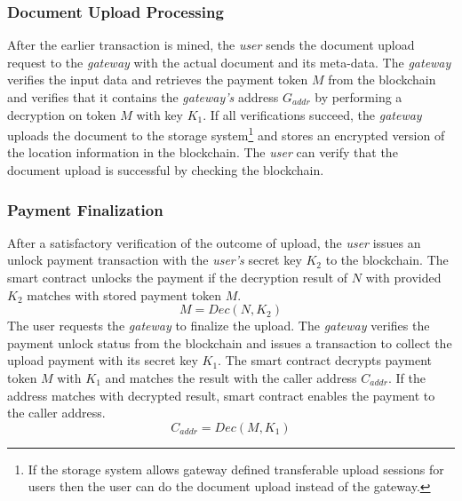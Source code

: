 \subsubsection{Document Upload Processing}
After the earlier transaction is mined, the \textit{user} sends the document upload request to the {\it gateway} with the actual document and its meta-data. The {\it gateway} verifies the input data and retrieves the payment token $M$ from the blockchain and verifies that it contains the {\it gateway's} address $G_{addr}$ by performing a decryption on token $M$ with key $K_1$. If all verifications succeed, the {\it gateway} uploads the document to the storage system\footnote{If the storage system allows gateway defined transferable upload sessions for users then the user can do the document upload instead of the gateway.} and stores an encrypted version of the location information in the blockchain. The {\it user} can verify that the document  upload is successful by checking the blockchain.

\subsubsection{Payment Finalization}
After a satisfactory verification of the outcome of upload, the {\it user} issues an unlock payment transaction with the \textit{user's} secret key $K_2$ to the blockchain. The smart contract unlocks the payment if the decryption result of $N$ with provided $K_2$ matches with stored payment token $M$.
\begin{equation}
\label{eq-u-3}
M = Dec (N, K_2)
\end{equation}
The user requests the {\it gateway} to finalize the upload. The {\it gateway} verifies the payment unlock status from the blockchain and issues a transaction to collect the upload payment with its secret key $K_1$. The smart contract decrypts payment token $M$ with $K_1$ and matches the result with the caller address $C_{addr}$. If the address matches with decrypted result, smart contract enables the payment to the caller address.
\begin{equation}
\label{eq-u-4}
C_{addr} = Dec (M, K_1)
\end{equation}

